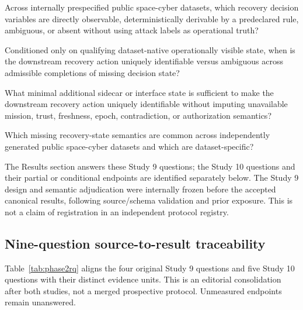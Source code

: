 \documentclass[preprint,12pt]{elsarticle}
\begin{document}
\begin{description}[leftmargin=1.15cm,labelwidth=0.95cm,style=nextline]
    \item[RQ1] Across internally prespecified public space-cyber datasets, which recovery decision variables are directly observable, deterministically derivable by a predeclared rule, ambiguous, or absent without using attack labels as operational truth?
    \item[RQ2] Conditioned only on qualifying dataset-native operationally visible state, when is the downstream recovery action uniquely identifiable versus ambiguous across admissible completions of missing decision state?
    \item[RQ3] What minimal additional sidecar or interface state is sufficient to make the downstream recovery action uniquely identifiable without imputing unavailable mission, trust, freshness, epoch, contradiction, or authorization semantics?
    \item[RQ4] Which missing recovery-state semantics are common across independently generated public space-cyber datasets and which are dataset-specific?
\end{description}

The Results section answers these Study 9 questions; the Study 10 questions and their partial or conditional endpoints are identified separately below. The Study 9 design and semantic adjudication were internally frozen before the accepted canonical results, following source/schema validation and prior exposure. This is not a claim of registration in an independent protocol registry.

\subsection{Nine-question source-to-result traceability}
\label{sec:phase2rq}
Table~\ref{tab:phase2rq} aligns the four original Study 9 questions and five Study 10 questions with their distinct evidence units. This is an editorial consolidation after both studies, not a merged prospective protocol. Unmeasured endpoints remain unanswered.
\end{document}
